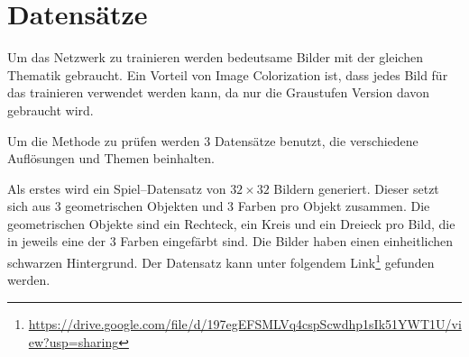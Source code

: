 \section{Datensätze}
Um das Netzwerk zu trainieren werden bedeutsame Bilder mit der gleichen Thematik gebraucht.
Ein Vorteil von Image Colorization ist, dass jedes Bild für das trainieren
verwendet werden kann, da nur die Graustufen Version davon gebraucht wird.

Um die Methode zu prüfen werden 3 Datensätze benutzt, die verschiedene Auflösungen und Themen beinhalten.

Als erstes wird ein Spiel–Datensatz von $ 32 \times 32 $ Bildern generiert. Dieser setzt sich aus 3 geometrischen Objekten und 3 Farben pro
Objekt zusammen. Die geometrischen Objekte sind ein Rechteck, ein Kreis und ein Dreieck pro Bild, die in jeweils eine der 3 Farben eingefärbt sind.
Die Bilder haben einen einheitlichen schwarzen Hintergrund. Der Datensatz kann unter folgendem Link\footnote{\url{https://drive.google.com/file/d/197egEFSMLVq4cspScwdhp1sIk51YWT1U/view?usp=sharing}} gefunden werden.

